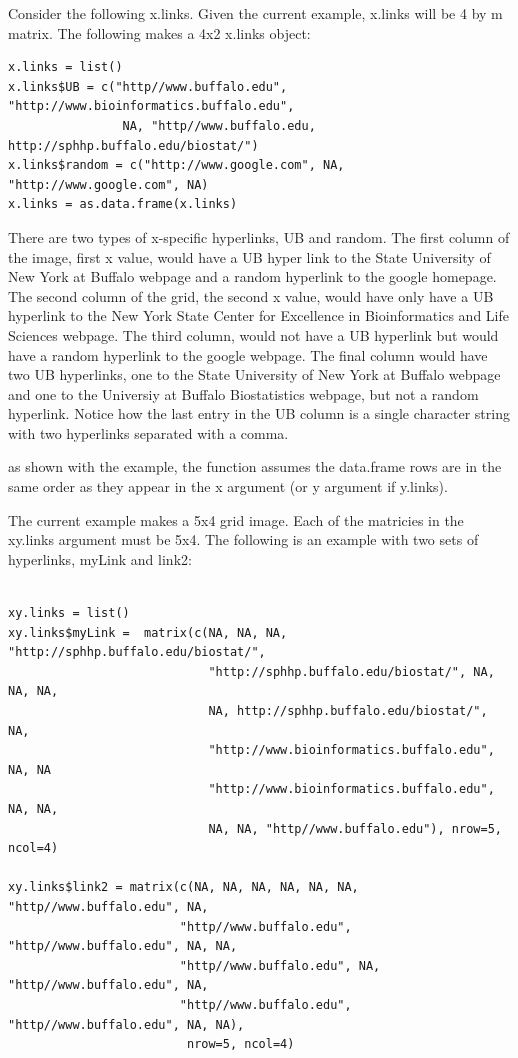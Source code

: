 \documentclass[]{article}
\begin{document}
\indent Consider the following x.links. Given the current example, x.links will be 4 by m matrix. The following makes a 4x2 x.links object: 
  

\begin{verbatim}
x.links = list()
x.links$UB = c("http//www.buffalo.edu", "http://www.bioinformatics.buffalo.edu", 
                NA, "http//www.buffalo.edu, http://sphhp.buffalo.edu/biostat/")
x.links$random = c("http://www.google.com", NA, "http://www.google.com", NA) 
x.links = as.data.frame(x.links)
\end{verbatim}
 

\indent There are two types of x-specific hyperlinks, UB and random. The first column of the image, first x value,  would have a UB  hyper link to the State University of New York at Buffalo webpage and a random hyperlink to the google homepage. The second column of the grid, the second x value, would have only have a UB hyperlink to the New York State Center for Excellence in Bioinformatics and Life Sciences webpage. The third column, would not have a UB hyperlink but would have a random hyperlink to the google webpage. The final column would have two UB hyperlinks, one to the State University of New York at Buffalo webpage and one to the Universiy at Buffalo Biostatistics webpage, but not a random hyperlink. Notice how the last entry in the UB column is a single character string with two hyperlinks separated with a comma. 

 as shown with the example, the function assumes the data.frame rows are in the same order as they appear in the x argument (or y argument if y.links).  \newline

\indent The current example makes a 5x4 grid image. Each of the matricies in the xy.links argument must be 5x4. The following is an example with two sets of hyperlinks, myLink and link2:

\begin{verbatim}

xy.links = list()
xy.links$myLink =  matrix(c(NA, NA, NA, "http://sphhp.buffalo.edu/biostat/",
                            "http://sphhp.buffalo.edu/biostat/", NA, NA, NA,
                            NA, http://sphhp.buffalo.edu/biostat/", NA,
                            "http://www.bioinformatics.buffalo.edu", NA, NA
                            "http://www.bioinformatics.buffalo.edu", NA, NA,
                            NA, NA, "http//www.buffalo.edu"), nrow=5, ncol=4)

xy.links$link2 = matrix(c(NA, NA, NA, NA, NA, NA, "http//www.buffalo.edu", NA, 
                        "http//www.buffalo.edu", "http//www.buffalo.edu", NA, NA,
                        "http//www.buffalo.edu", NA, "http//www.buffalo.edu", NA, 
                        "http//www.buffalo.edu", "http//www.buffalo.edu", NA, NA), 
                         nrow=5, ncol=4)

\end{verbatim}
\end{document}
